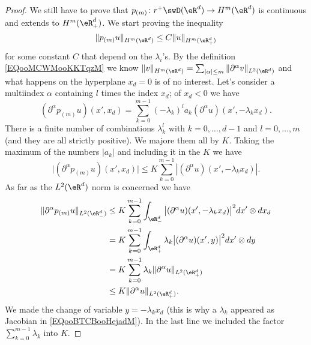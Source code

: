 \begin{proof}
	We still have to prove that \(p_{(m)}\colon r^+\swD(\eR^d)\to H^m(\eR^d)\) is continuous and extends to \( H^m(\eR^d_+)\). We start proving the inequality
	\begin{equation}
		\| p_{(m)}u \|_{H^m(\eR^d)}\leq C \| u \|_{H^m(\eR^d_+)}
	\end{equation}
	for some constant \( C\) that depend on the \( \lambda_i\)'s. By the definition \ref{EQooMCWMooKKTqzM} we know \( \| v \|_{H^m(\eR^d)}=\sum_{| \alpha |\leq m}\| \partial^{\alpha}v \|_{L^2(\eR^d)}\) and what happens on the hyperplane \( x_d=0\) is of no interest. Let's consider a multiindex \( \alpha\) containing \( l\) times the index \( x_d\); of \( x_d<0\) we have
	\begin{equation}
		(\partial^{\alpha}p_{(m)}u)(x',x_d)=\sum_{k=0}^{m-1}(-\lambda_k)^la_k(\partial^{\alpha}u)(x',-\lambda_kx_d).
	\end{equation}
	There is a finite number of combinations \( \lambda_k^l\) with \( k=0,\ldots, d-1\) and \( l=0,\ldots, m\) (and they are all strictly positive). We majore them all by \( K\). Taking the maximum of the numbers \( | a_k |\) and including it in the \( K\) we have
	\begin{equation}
		\big| (\partial^{\alpha}p_{(m)}u)(x',x_d) \big|\leq K \sum_{k=0}^{m-1}| (\partial^{\alpha}u)(x',-\lambda_k x_d) |.
	\end{equation}
	As far as the \( L^2(\eR^d)\) norm is concerned we have
	\begin{subequations}
		\begin{align}
			\| \partial^{\alpha}p_{(m)}u \|_{L^2(\eR^d_-)} & \leq K\sum_{k=0}^{m-1}\int_{\eR^d_-}\big| (\partial^{\alpha}u)(x',-\lambda_k x_d) \big|^2dx'\otimes dx_d                 \\
			                                               & =K\sum_{k=0}^{m-1}\int_{\eR^d_+}\lambda_k\big| (\partial^{\alpha}u)(x',y) \big|^2dx'\otimes dy  \label{EQooBTCBooHejadM} \\
			                                               & =K\sum_{k=0}^{m-1}\lambda_k\| \partial^{\alpha}u \|_{L^2(\eR^d_+)}                                                       \\
			                                               & \leq K\| \partial^{\alpha}u \|_{L^2(\eR^d_+)}.
		\end{align}
	\end{subequations}
	We made the change of variable \(y=-\lambda_k x_d\) (this is why a \( \lambda_k\) appeared as Jacobian in \eqref{EQooBTCBooHejadM}). In the last line we included the factor \( \sum_{k=0}^{m-1}\lambda_k\) into \( K\).


\end{proof}
